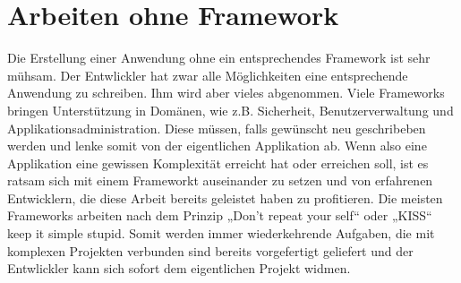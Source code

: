 \section{Arbeiten ohne Framework}
Die Erstellung einer Anwendung ohne ein entsprechendes Framework ist sehr
mühsam. Der Entwlickler hat zwar alle Möglichkeiten eine entsprechende
Anwendung zu schreiben. Ihm wird aber vieles abgenommen. Viele Frameworks
bringen Unterstützung in Domänen, wie z.B. Sicherheit, Benutzerverwaltung und
Applikationsadministration. Diese müssen, falls gewünscht neu geschribeben
werden und lenke somit von der eigentlichen Applikation ab. Wenn also eine
Applikation eine gewissen Komplexität erreicht hat oder erreichen soll, ist es
ratsam sich mit einem Frameworkt auseinander zu setzen und von erfahrenen
Entwicklern, die diese Arbeit bereits geleistet haben zu profitieren. Die
meisten Frameworks arbeiten nach dem Prinzip „Don't repeat your self“ oder
„KISS“ keep it simple stupid. Somit werden immer wiederkehrende Aufgaben, die
mit komplexen Projekten verbunden sind bereits vorgefertigt geliefert und der
Entwlickler kann sich sofort dem eigentlichen Projekt widmen. 


